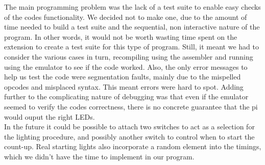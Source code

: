 The main programming problem was the lack of a test suite to enable easy checks of the codes functionality. We decided not to make one, due to the amount of time needed to build a test suite and the sequential, non interactive nature of the program. In other words, it would not be worth wasting time spent on the extension to create a test suite for this type of program. Still, it meant we had to consider the various cases in turn, recompiling using the assembler and running using the emulator to see if the code worked. Also, the only error messages to help us test the code were segmentation faults, mainly due to the mispelled opcodes and misplaced syntax. This meant errors were hard to spot. Adding further to the complicating nature of debugging was that even if the emulator seemed to verify the codes correctness, there is no concrete guarantee that the pi would ouput the right LEDs.
~\\

In the future it could be possible to attach two switches to act as a selection for the lighting procedure, and possibly another switch to control when to start the count-up. Real starting lights also incorporate a random element into the timings, which we didn't have the time to implement in our program.

